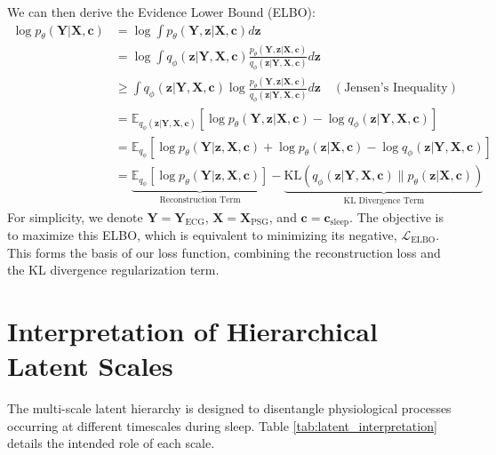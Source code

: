 \documentclass[10pt, conference]{IEEEtran}
\newcommand{\KL}[2]{\mathrm{KL}\left(#1 \parallel #2\right)}
\begin{document}
We can then derive the Evidence Lower Bound (ELBO):
\begin{align}
\log p_\theta(\mathbf{Y} | \mathbf{X}, \mathbf{c}) &= \log \int p_\theta(\mathbf{Y}, \mathbf{z} | \mathbf{X}, \mathbf{c}) d\mathbf{z} \\
&= \log \int q_\phi(\mathbf{z} | \mathbf{Y}, \mathbf{X}, \mathbf{c}) \frac{p_\theta(\mathbf{Y}, \mathbf{z} | \mathbf{X}, \mathbf{c})}{q_\phi(\mathbf{z} | \mathbf{Y}, \mathbf{X}, \mathbf{c})} d\mathbf{z} \\
&\geq \int q_\phi(\mathbf{z} | \mathbf{Y}, \mathbf{X}, \mathbf{c}) \log \frac{p_\theta(\mathbf{Y}, \mathbf{z} | \mathbf{X}, \mathbf{c})}{q_\phi(\mathbf{z} | \mathbf{Y}, \mathbf{X}, \mathbf{c})} d\mathbf{z} \quad (\text{Jensen's Inequality}) \\
&= \mathbb{E}_{q_\phi(\mathbf{z}|\mathbf{Y},\mathbf{X},\mathbf{c})} \left[ \log p_\theta(\mathbf{Y}, \mathbf{z} | \mathbf{X}, \mathbf{c}) - \log q_\phi(\mathbf{z} | \mathbf{Y}, \mathbf{X}, \mathbf{c}) \right] \\
&= \mathbb{E}_{q_\phi} \left[ \log p_\theta(\mathbf{Y} | \mathbf{z}, \mathbf{X}, \mathbf{c}) + \log p_\theta(\mathbf{z} | \mathbf{X}, \mathbf{c}) - \log q_\phi(\mathbf{z} | \mathbf{Y}, \mathbf{X}, \mathbf{c}) \right] \\
&= \underbrace{\mathbb{E}_{q_\phi}[\log p_\theta(\mathbf{Y} | \mathbf{z}, \mathbf{X}, \mathbf{c})]}_{\text{Reconstruction Term}} - \underbrace{\KL{q_\phi(\mathbf{z} | \mathbf{Y}, \mathbf{X}, \mathbf{c})}{p_\theta(\mathbf{z} | \mathbf{X}, \mathbf{c})}}_{\text{KL Divergence Term}}
\end{align}
For simplicity, we denote $\mathbf{Y} = \mathbf{Y}_{\text{ECG}}$, $\mathbf{X} = \mathbf{X}_{\text{PSG}}$, and $\mathbf{c} = \mathbf{c}_{\text{sleep}}$. The objective is to maximize this ELBO, which is equivalent to minimizing its negative, $\mathcal{L}_{\text{ELBO}}$. This forms the basis of our loss function, combining the reconstruction loss and the KL divergence regularization term.

\section{Interpretation of Hierarchical Latent Scales}
\label{app:latent_scales}

The multi-scale latent hierarchy is designed to disentangle physiological processes occurring at different timescales during sleep. Table \ref{tab:latent_interpretation} details the intended role of each scale.
\end{document}
